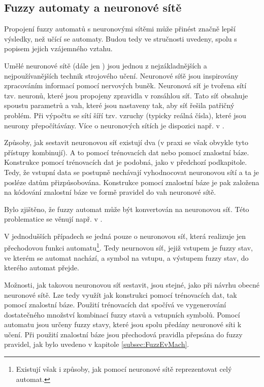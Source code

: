 \subsection{Fuzzy automaty a neuronové sítě}
Propojení fuzzy automatů s neuronovými sítěmi může přinést značně lepší výsledky, než učící se automaty. Budou tedy ve stručnosti uvedeny, spolu s popisem jejich vzájemného vztahu.

Umělé neuronové sítě (dále jen ) jsou jednou z nejzákladnějších a nejpoužívanějších technik strojového učení. Neuronové síťě jsou inspirovány zpracováním informací pomocí nervových buněk. Neuronová síť je tvořena sítí tzv. neuronů, které jsou propojeny zpravidla v rozsáhlou síť. Tato síť obsahuje spoustu parametrů a vah, které jsou nastaveny tak, aby síť řešila patřičný problém. Při výpočtu se sítí šíří tzv. vzruchy (typicky reálná čísla), které jsou neurony přepočítávány. Více o neuronových sítích je dispozici např. v \cite{FieRus-HanNeuCom}.

Způsoby, jak sestavit neuronovou síť existují dva (v praxi se však obvykle tyto přístupy kombinují). A to pomocí trénovacích dat nebo pomocí znalostní báze. Konstrukce pomocí trénovacích dat je podobná, jako v předchozí podkapitole. Tedy, že vstupní data se postupně nechávají vyhodnocovat neuronovou sítí a ta je posléze datům přizpůsobována. Konstrukce pomocí znalostní báze je pak založena na kódování znalostní báze ve formě \ifthen pravidel do vah neuronové sítě.

Bylo zjištěno, že fuzzy automat může být konvertován na neuronovou síť. Této problematice se věnují např. v \cite{DarAhmSin-AppFuzzAutTheKnBsNeuNetDevBasLeaMod, OmlThoGil-FuzzFinStaAutCanDetEncIntRecNeuNet, BlaDelPeg-FuzzAutIndUsNeuNet, GilOmlTho-EquKnoRep+, OmlThoGil-RepFuzFinStaAuConRecNeuNet, UnaKha-FuzDFinStaMachImpBasNeuFuzSys, PedGac-LeaFuzzAut}.

V jednodušších případech se jedná pouze o neuronovou síť, která realizuje jen přechodovou funkci automatu\footnote{Existují však i způsoby, jak pomocí neuronové sítě reprezentovat celý automat.}. Tedy neurnovou síť, jejiž vstupem je fuzzy stav, ve kterém se automat nachází, a symbol na vstupu, a výstupem fuzzy stav, do kterého automat přejde.

Možnosti, jak takovou neuronovou síť sestavit, jsou stejné, jako při návrhu obecné neuronové sítě. Lze tedy využít jak konstrukci pomocí trénovacích dat, tak pomocí znalostní báze. Použití trénovacích dat spočívá ve vygenerování dostatečného množství kombinací fuzzy stavů a vstupních symbolů. Pomocí automatu jsou určeny  fuzzy stavy, které jsou spolu předány neuronové síti k učení. Při použití znalostní báze jsou přechodová pravidla přepsána do fuzzy \ifthen pravidel, jak bylo uvedeno v kapitole \ref{subsec:FuzzEvMach}.

